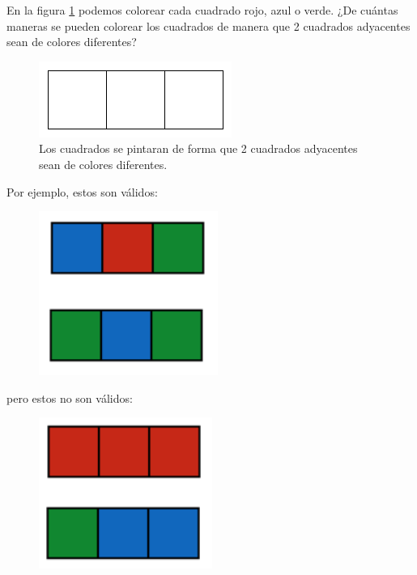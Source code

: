 \documentclass[10pt]{article}
\begin{document}
\begin{problema}
    En la figura \ref{cuadro1} podemos colorear cada cuadrado rojo, azul o verde. ¿De cuántas maneras se pueden colorear los cuadrados de manera que 2 cuadrados adyacentes sean de colores diferentes?
    \begin{figure}[h]
        \centering
        \includegraphics[scale=0.5]{Imagenes/IMG1/ejem.png}
        \caption{Los cuadrados se pintaran de forma que 2 cuadrados adyacentes sean de colores diferentes.}
        \label{cuadro1}
    \end{figure}

Por ejemplo, estos son válidos:
\begin{figure}[h!]
    \centering
    \includegraphics[scale=0.5]{Imagenes/IMG1/ejem1.png}
\end{figure}

pero estos no son válidos:
\begin{figure}[h!]
    \centering
    \includegraphics[scale=0.5]{Imagenes/IMG1/ejem2.png}
\end{figure}
\end{problema}
\end{document}
